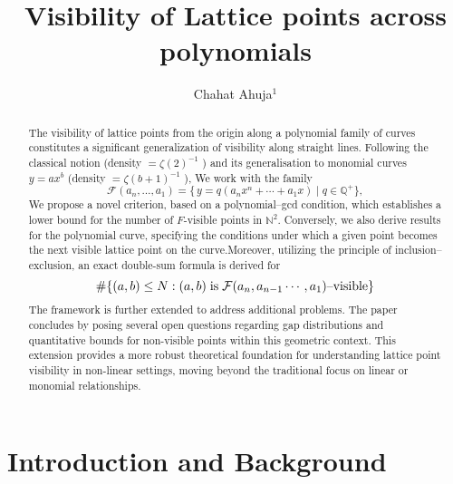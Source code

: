 \documentclass[12pt, reqno]{amsart}
\theoremstyle{definition}
\theoremstyle{remark}
\numberwithin{equation}{section}
\begin{document}
\setcounter{page}{1}


\title[Visibility of lattice points]{Visibility of Lattice points across polynomials}


\author[Chahat Ahuja]{Chahat Ahuja$^{1}$}

\address{$^{1}$ Department of Mathematics, IIITD, New Delhi.}
\email{\textcolor[rgb]{0.00,0.00,0.84}{chahat22138@iiitd.ac.in}}


\begin{abstract}
The visibility of lattice points from the origin along a polynomial family of curves constitutes a significant generalization of visibility along straight lines. Following the classical notion (density $=\zeta(2)^{-1}$ ) and its generalisation to monomial curves $y=ax^b$ (density $=\zeta(b+1)^{-1}$ ), We work with  the family
\[
\mathcal{F}(a_n,\dots,a_1)=\bigl\{\,y=q(a_n x^n+\cdots+a_1 x)\mid q\in\mathbb{Q}^+\bigr\},
\]
We propose a novel criterion, based on a polynomial--gcd condition, which establishes a lower bound for the number of $F$-visible points in $\mathbb{N}^2$. Conversely, we also derive results for the polynomial curve, specifying the conditions under which a given point becomes the next visible lattice point on the curve.Moreover, utilizing the principle of inclusion--exclusion, an exact double-sum formula is derived for 
$$\#\{(a,b)\leq N :(a,b) \hspace{0.1cm}\text{is}\hspace{0.1cm} \mathcal{F}(a_{n} , a_{n-1} \cdots , a_{1})\text{--visible}\}$$
The framework is further extended to address additional problems. The paper concludes by posing several open questions regarding gap distributions and quantitative bounds for non-visible points within this geometric context. This extension provides a more robust theoretical foundation for understanding lattice point visibility in non-linear settings, moving beyond the traditional focus on linear or monomial relationships.
\end{abstract}
 \maketitle

\section{Introduction and Background}
\end{document}
